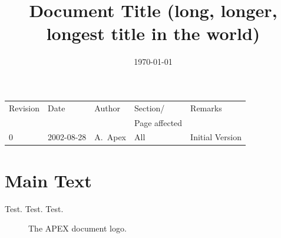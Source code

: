 \documentclass{article}
\date{\today}
\title{Document Title (long, longer, longest title in the world)}
\author{}
\begin{document}
\maketitle

\newpage
\begin{center}
{\sf
\begin{tabular}{|l|l|l|l|l|}
\hline
Revision & Date & Author & Section/ & Remarks \\
         &      &        & Page affected  &         \\
\hline
0& 2002-08-28 & A.\ Apex & All & Initial Version   \\
\hline
\end{tabular}
\vfill
}
\end{center}
\newpage

{\sf \tableofcontents}
\newpage



\section{Main Text}
Test. Test. Test.

\begin{figure} 
\caption[] {The APEX document logo.}
\label{fig:apexlogo} \begin{flushright} \begin{minipage}{88 mm}
\end{minipage} \end{flushright}
\end{figure}
\end{document}
